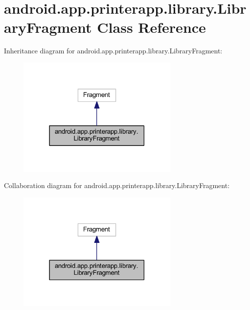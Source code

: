 \hypertarget{classandroid_1_1app_1_1printerapp_1_1library_1_1_library_fragment}{}\section{android.\+app.\+printerapp.\+library.\+Library\+Fragment Class Reference}
\label{classandroid_1_1app_1_1printerapp_1_1library_1_1_library_fragment}


Inheritance diagram for android.\+app.\+printerapp.\+library.\+Library\+Fragment\+:
\nopagebreak
\begin{figure}[H]
\begin{center}
\leavevmode
\includegraphics[width=225pt]{classandroid_1_1app_1_1printerapp_1_1library_1_1_library_fragment__inherit__graph}
\end{center}
\end{figure}


Collaboration diagram for android.\+app.\+printerapp.\+library.\+Library\+Fragment\+:
\nopagebreak
\begin{figure}[H]
\begin{center}
\leavevmode
\includegraphics[width=225pt]{classandroid_1_1app_1_1printerapp_1_1library_1_1_library_fragment__coll__graph}
\end{center}
\end{figure}

